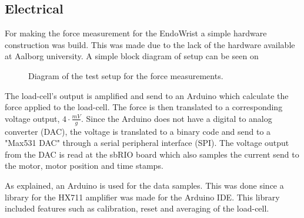 \subsection*{Electrical }
For making the force measurement for the EndoWrist a simple hardware construction was build. This was made due to the lack of the hardware available at Aalborg university. A simple block diagram of setup can be seen on 

\begin{figure}[H]
\centering
{}
\caption{Diagram of the test setup for the force measurements.}
\label{fig:arduino_loadcell}
\end{figure}

The load-cell's output is amplified and send to an Arduino which calculate the force applied to the load-cell. The force is then translated to a corresponding voltage output, $4\cdot\frac{mV}{g}$. Since the Arduino does not have a digital to analog converter (DAC), the voltage is translated to a binary code and send to a "Max531 DAC" through a serial peripheral interface (SPI). The voltage output from the DAC is read at the sbRIO board which also samples the current send to the motor, motor position and time stamps.

As explained, an Arduino is used for the data samples. This was done since a library for the HX711 amplifier was made for the Arduino IDE\cite{Git_HX711}. This library included features such as calibration, reset and averaging of the load-cell. 


